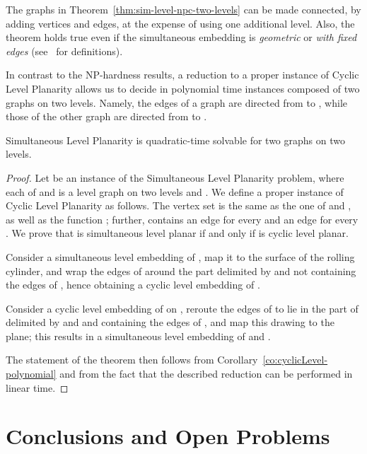 \documentclass{llncs}
\newcommand{\Gr}[1]{\xspace}
\newcommand{\Gb}[1]{\xspace}
\newcommand{\sefeinstance}[1]{\xspace}
\begin{document}
The graphs in Theorem~\ref{thm:sim-level-npc-two-levels} can be made connected, by adding vertices and edges, at the expense of using one additional level. Also, the theorem holds true even if the simultaneous embedding is {\em geometric} or {\em with fixed edges} (see~\cite{bkr-sepg-13,bcdeeiklm-spge-07} for definitions).

In contrast to the NP-hardness results, a reduction to a proper instance of {\sc Cyclic Level Planarity} allows us to decide in polynomial time instances composed of two graphs on two levels. Namely, the edges of a graph are directed from  to , while those of the other graph are directed from  to .

\begin{theorem} \label{th:sim-poly}
{\sc Simultaneous Level Planarity} is quadratic-time solvable for two graphs on two levels. 
\end{theorem}

\begin{proof}
Let  be an instance of the {\sc Simultaneous Level Planarity} problem, where each of \Gr{} and \Gb{} is a level graph on two levels  and . We define a proper instance  of {\sc Cyclic Level Planarity} as follows. The vertex set  is the same as the one of \Gr{} and \Gb{}, as well as the function ; further,  contains an edge  for every  and an edge  for every . We prove that  is simultaneous level planar if and only if  is cyclic level planar.

 Consider a simultaneous level embedding of \sefeinstance{}, map it to the surface  of the rolling cylinder, and wrap the edges of \Gb{} around the part delimited by  and  not containing the edges of \Gr{}, hence obtaining a cyclic level embedding of . 

 Consider a cyclic level embedding of  on , reroute the edges of \Gb{} to lie in the part of  delimited by  and  and containing the edges of \Gr{}, and map this drawing to the plane; this results in a simultaneous level embedding of \Gr{} and \Gb{}. 

The statement of the theorem then follows from Corollary~\ref{co:cyclicLevel-polynomial} and from the fact that the described reduction can be performed in linear time.
\end{proof}









\section{Conclusions and Open Problems} \label{se:conclusions}
\end{document}
